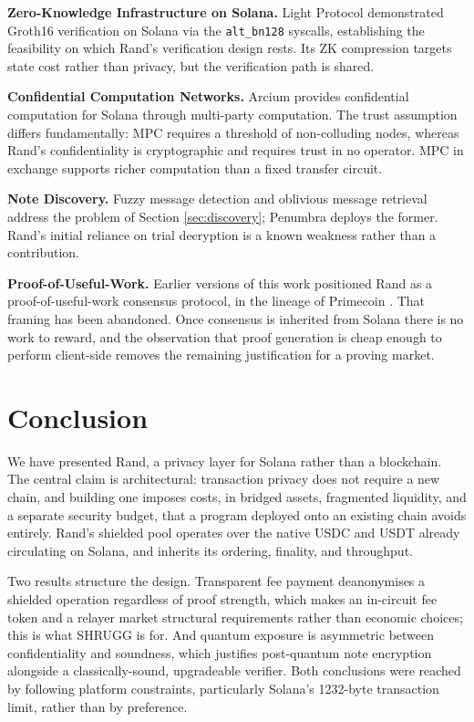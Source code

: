 \documentclass[11pt,a4paper]{article}
\begin{document}
\textbf{Zero-Knowledge Infrastructure on Solana.} Light Protocol \cite{LightProtocol} demonstrated Groth16 verification on Solana via the \texttt{alt\_bn128} syscalls, establishing the feasibility on which Rand's verification design rests. Its ZK compression targets state cost rather than privacy, but the verification path is shared.

\textbf{Confidential Computation Networks.} Arcium \cite{Arcium} provides confidential computation for Solana through multi-party computation. The trust assumption differs fundamentally: MPC requires a threshold of non-colluding nodes, whereas Rand's confidentiality is cryptographic and requires trust in no operator. MPC in exchange supports richer computation than a fixed transfer circuit.

\textbf{Note Discovery.} Fuzzy message detection \cite{Beck2021} and oblivious message retrieval \cite{Liu2022} address the problem of Section \ref{sec:discovery}; Penumbra deploys the former. Rand's initial reliance on trial decryption is a known weakness rather than a contribution.

\textbf{Proof-of-Useful-Work.} Earlier versions of this work positioned Rand as a proof-of-useful-work consensus protocol, in the lineage of Primecoin \cite{King2013}. That framing has been abandoned. Once consensus is inherited from Solana there is no work to reward, and the observation that proof generation is cheap enough to perform client-side removes the remaining justification for a proving market.

\section{Conclusion}
\label{sec:conclusion}

We have presented Rand, a privacy layer for Solana rather than a blockchain. The central claim is architectural: transaction privacy does not require a new chain, and building one imposes costs, in bridged assets, fragmented liquidity, and a separate security budget, that a program deployed onto an existing chain avoids entirely. Rand's shielded pool operates over the native USDC and USDT already circulating on Solana, and inherits its ordering, finality, and throughput.

Two results structure the design. Transparent fee payment deanonymises a shielded operation regardless of proof strength, which makes an in-circuit fee token and a relayer market structural requirements rather than economic choices; this is what SHRUGG is for. And quantum exposure is asymmetric between confidentiality and soundness, which justifies post-quantum note encryption alongside a classically-sound, upgradeable verifier. Both conclusions were reached by following platform constraints, particularly Solana's 1232-byte transaction limit, rather than by preference.
\end{document}
